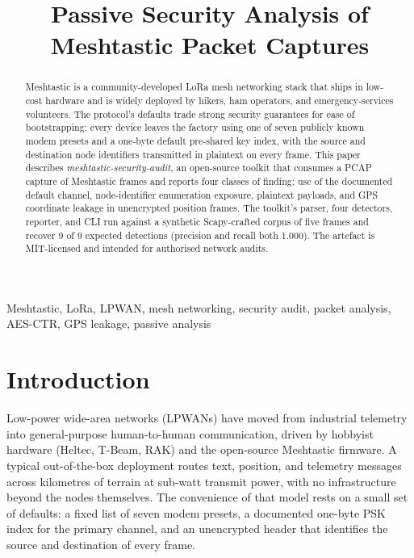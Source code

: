 \documentclass[conference,a4paper,10pt]{IEEEtran}
\begin{document}
\title{Passive Security Analysis of Meshtastic Packet Captures}

\author{
}

\maketitle

\begin{abstract}
Meshtastic is a community-developed LoRa mesh networking stack that
ships in low-cost hardware and is widely deployed by hikers, ham
operators, and emergency-services volunteers. The protocol's defaults
trade strong security guarantees for ease of bootstrapping: every
device leaves the factory using one of seven publicly known modem
presets and a one-byte default pre-shared key index, with the source
and destination node identifiers transmitted in plaintext on every
frame. This paper describes \emph{meshtastic-security-audit}, an
open-source toolkit that consumes a PCAP capture of Meshtastic frames
and reports four classes of finding: use of the documented default
channel, node-identifier enumeration exposure, plaintext payloads,
and GPS coordinate leakage in unencrypted position frames. The
toolkit's parser, four detectors, reporter, and CLI run against a
synthetic Scapy-crafted corpus of five frames and recover 9 of 9
expected detections (precision and recall both 1.000). The artefact
is MIT-licensed and intended for authorised network audits.
\end{abstract}

\begin{IEEEkeywords}
Meshtastic, LoRa, LPWAN, mesh networking, security audit, packet
analysis, AES-CTR, GPS leakage, passive analysis
\end{IEEEkeywords}

\section{Introduction}

Low-power wide-area networks (LPWANs) have moved from industrial
telemetry into general-purpose human-to-human communication, driven
by hobbyist hardware (Heltec, T-Beam, RAK) and the open-source
Meshtastic firmware. A typical out-of-the-box deployment routes
text, position, and telemetry messages across kilometres of terrain
at sub-watt transmit power, with no infrastructure beyond the nodes
themselves. The convenience of that model rests on a small set of
defaults: a fixed list of seven modem presets, a documented one-byte
PSK index for the primary channel, and an unencrypted header that
identifies the source and destination of every frame.
\end{document}

